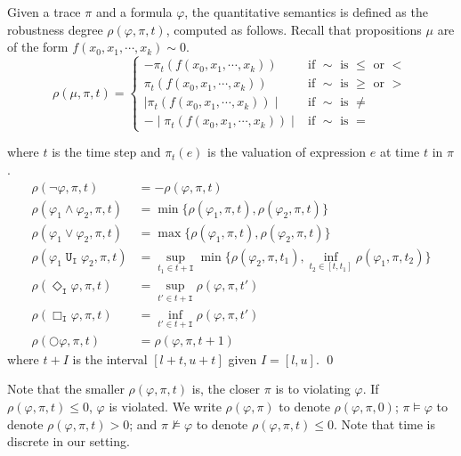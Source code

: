 \begin{definition}\label{def:Quantitative_Semantics}
Given a trace $\pi$ and a formula $\varphi$, the quantitative semantics is defined as the robustness degree $\rho(\varphi, \pi,t)$, computed as follows.
Recall that propositions $\mu$ are of the form $f(x_0,x_1,\cdots,x_k) \sim 0$.
{\small\begin{equation*}
  \rho(\mu, \pi, t) =
    \begin{cases}
      -\pi_t(f(x_0,x_1,\cdots, x_k)) & \text{if $\sim$ is $\leq$ or $<$}\\
      \pi_t(f(x_0,x_1,\cdots, x_k)) & \text{if $\sim$ is $\geq$ or $>$}\\
      \mid \pi_t(f(x_0,x_1,\cdots, x_k)) \mid & \text{if $\sim$ is $\neq$}\\
      -\mid \pi_t(f(x_0,x_1,\cdots, x_k)) \mid & \text{if $\sim$ is $=$}
    \end{cases}       
\end{equation*}}

\noindent where $t$ is the time step and $\pi_t(e)$ is the valuation of expression $e$ at time $t$ in $\pi$.
{\small\begin{align*}
\rho(\neg\varphi,\pi,t) & = -\rho(\varphi,\pi,t) \\
\rho(\varphi_1 \land \varphi_2,\pi,t) & = \min\{\rho(\varphi_1,\pi,t),\rho(\varphi_2,\pi,t)\} \\
\rho(\varphi_1 \lor \varphi_2,\pi,t) & = \max\{\rho(\varphi_1,\pi,t),\rho(\varphi_2,\pi,t)\} \\
\rho(\varphi_1 \;\mathtt{U_I}\; \varphi_2,\pi,t) & = \sup_{t_1 \in t+\mathtt{I}} \min \{\rho(\varphi_2,\pi,t_1), \inf_{t_2 \in [t,t_1]} \rho(\varphi_1,\pi,t_2)\}\\
\rho(\Diamond_\mathtt{I}\varphi,\pi,t) & = \sup_{t'\in t+\mathtt{I}}\rho(\varphi,\pi,t') \\
\rho(\Box_\mathtt{I}\varphi,\pi,t) & = \inf_{t'\in t+\mathtt{I}}\rho(\varphi,\pi,t') \\
\rho(\bigcirc \varphi,\pi,t) & = \rho(\varphi,\pi,t+1)
\end{align*}}
where $t+I$ is the interval $[l+t,u+t]$ given $I=[l,u]$.
\qed
\end{definition}

Note that the smaller $\rho(\varphi,\pi,t)$ is, the closer $\pi$ is to violating $\varphi$.
If $\rho(\varphi,\pi,t) \leq 0$, $\varphi$ is violated.
We write $\rho(\varphi,\pi)$ to denote $\rho(\varphi,\pi,0)$; $\pi \vDash \varphi$ to denote $\rho(\varphi,\pi,t) > 0$; and $\pi \not \vDash \varphi$ to denote $\rho(\varphi,\pi,t) \leq 0$. Note that time is discrete in our setting. 

